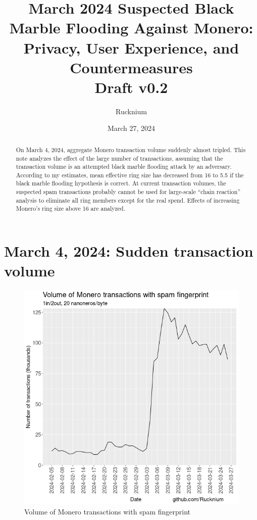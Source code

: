 \documentclass[usletter,11pt,english,openany]{article}
\begin{document}
\title{March 2024 Suspected Black Marble Flooding Against Monero:
Privacy, User Experience, and Countermeasures\\\vspace{.3cm}
\large Draft v0.2\vspace{-.715cm}}
\author{Rucknium }
\date{March 27, 2024}
\maketitle
\begin{abstract}
On March 4, 2024, aggregate Monero transaction volume suddenly almost
tripled. This note analyzes the effect of the large number of transactions,
assuming that the transaction volume is an attempted black marble
flooding attack by an adversary. According to my estimates, mean effective
ring size has decreased from 16 to 5.5 if the black marble flooding
hypothesis is correct. At current transaction volumes, the suspected
spam transactions probably cannot be used for large-scale ``chain
reaction'' analysis to eliminate all ring members except for the
real spend. Effects of increasing Monero's ring size above 16 are
analyzed.
\end{abstract}

\section{March 4, 2024: Sudden transaction volume }

\begin{figure}[H]
\caption{Volume of Monero transactions with spam fingerprint}
\label{fig-spam-tx-volume}
\centering{}\includegraphics[scale=0.5]{images/spam-fingerprint-tx-volume}
\end{figure}
\end{document}
